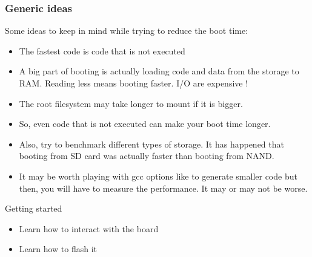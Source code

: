 \begin{frame}
\frametitle{Generic ideas}
Some ideas to keep in mind while trying to reduce the boot time:
\begin{itemize}
\item The fastest code is code that is not executed
\item A big part of booting is actually loading code and data from the
      storage to RAM. Reading less means booting faster. I/O are
      expensive !
\item The root filesystem may take longer to mount if it is bigger.
\item So, even code that is not executed can make your boot time
      longer.
\item Also, try to benchmark different types of storage. It has
      happened that booting from SD card was actually faster than
      booting from NAND.
\item It may be worth playing with gcc options like  to
      generate smaller code but then, you will have to measure
      the performance. It may or may not be worse.
\end{itemize}
\end{frame}

\setuplabframe
{Getting started}
{
\begin{itemize}
\item Learn how to interact with the board
\item Learn how to flash it 
\end{itemize}
}

